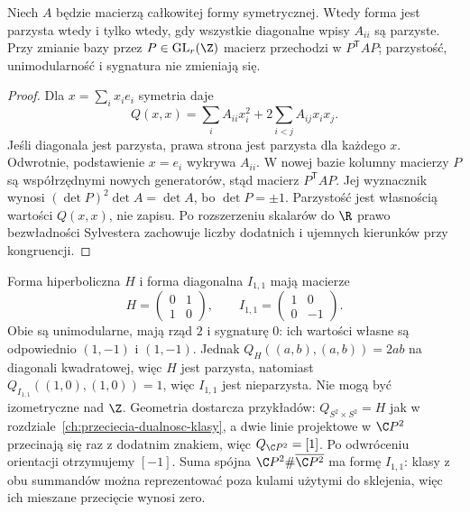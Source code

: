 \begin{stwierdzenie}
\label{prop:freedman-basis}
Niech $A$ będzie macierzą całkowitej formy symetrycznej.
Wtedy forma jest parzysta wtedy i tylko wtedy, gdy
wszystkie diagonalne wpisy $A_{ii}$ są parzyste.
Przy zmianie bazy przez $P\in\mathrm{GL}_r(\Z)$ macierz
przechodzi w $P^{\mathsf T}AP$; parzystość,
unimodularność i sygnatura nie zmieniają się.
\end{stwierdzenie}
\begin{proof}
Dla $x=\sum_i x_i e_i$ symetria daje
\begin{equation}\label{eq:freedman-parity}
 Q(x,x)=\sum_i A_{ii}x_i^2
             +2\sum_{i<j}A_{ij}x_ix_j.
\end{equation}
Jeśli diagonala jest parzysta, prawa strona jest
parzysta dla każdego $x$. Odwrotnie, podstawienie
$x=e_i$ wykrywa $A_{ii}$. W nowej bazie kolumny
macierzy $P$ są współrzędnymi nowych generatorów,
stąd macierz $P^{\mathsf T}AP$. Jej wyznacznik wynosi
$(\det P)^2\det A=\det A$, bo $\det P=\pm1$.
Parzystość jest własnością wartości $Q(x,x)$,
nie zapisu. Po rozszerzeniu skalarów do $\R$
prawo bezwładności Sylvestera zachowuje liczby
dodatnich i ujemnych kierunków przy kongruencji.
\end{proof}

\begin{przyklad}
\label{prz:freedman-H-I}
Forma hiperboliczna $H$ i forma diagonalna $I_{1,1}$
mają macierze
\[
 H=\begin{pmatrix}0&1\\1&0\end{pmatrix},
 \qquad
 I_{1,1}=\begin{pmatrix}1&0\\0&-1\end{pmatrix}.
\]
Obie są unimodularne, mają rząd $2$ i sygnaturę $0$:
ich wartości własne są odpowiednio $(1,-1)$ i $(1,-1)$.
Jednak $Q_H((a,b),(a,b))=2ab$ na diagonali kwadratowej,
więc $H$ jest parzysta, natomiast
$Q_{I_{1,1}}((1,0),(1,0))=1$, więc $I_{1,1}$ jest nieparzysta.
Nie mogą być izometryczne nad $\Z$.
Geometria dostarcza przykładów: $Q_{S^2\times S^2}=H$
jak w rozdziale~\ref{ch:przeciecia-dualnosc-klasy},
a dwie linie projektowe w $\C P^2$ przecinają się
raz z dodatnim znakiem, więc $Q_{\C P^2}=[1]$.
Po odwróceniu orientacji otrzymujemy $[-1]$.
Suma spójna $\C P^2\#\overline{\C P^2}$
ma formę $I_{1,1}$: klasy z obu summandów można
reprezentować poza kulami użytymi do sklejenia,
więc ich mieszane przecięcie wynosi zero.
\end{przyklad}

